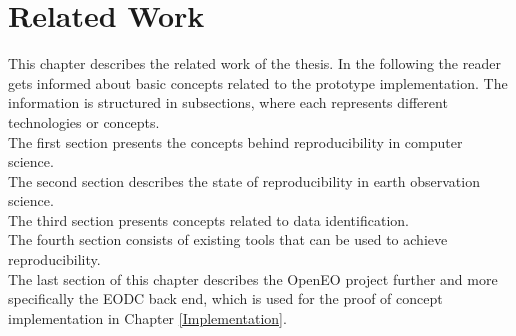 \documentclass[draft,final]{vutinfth} %
\begin{document}
\chapter{Related Work}\label{Related Work}

This chapter describes the related work of the thesis. In the following the reader gets informed about basic concepts related to the prototype implementation. The information is structured in subsections, where each represents different technologies or concepts. \\The first section presents the concepts behind reproducibility in computer science. \\
The second section describes the state of reproducibility in earth observation science. \\
The third section presents concepts related to data identification. \\ 
The fourth section consists of existing tools that can be used to achieve reproducibility. \\
The last section of this chapter describes the OpenEO project further and more specifically the EODC back end, which is used for the proof of concept implementation in Chapter \ref{Implementation}.    
\end{document}
